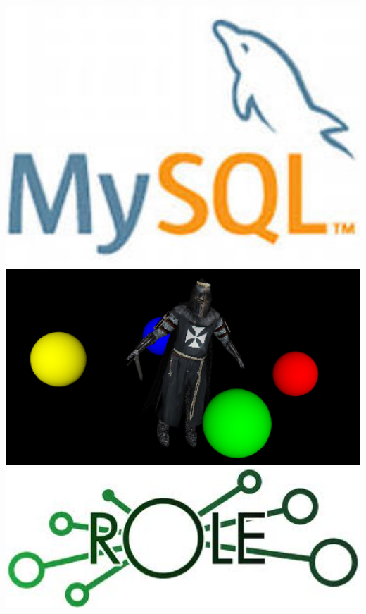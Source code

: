 \begin{frame}
\begin{columns}
\begin{column}{0.3\textwidth}
   	  \includegraphics[width=1\textwidth]{images/mysql}\\
	\bigskip
   	  \includegraphics[width=1\textwidth]{images/model}\\
\bigskip
   	  \includegraphics[width=1\textwidth]{images/role}\\   	
\end{column}
  \end{columns}	
\end{frame}






